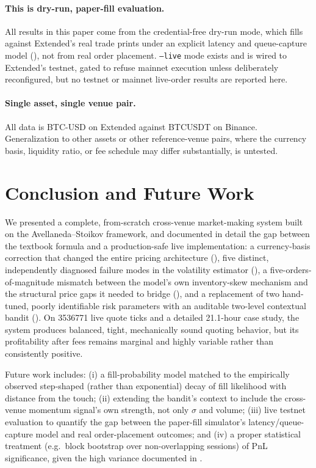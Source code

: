 \documentclass[11pt,a4paper]{article}
\begin{document}
\paragraph{This is dry-run, paper-fill evaluation.} All results in this paper come from the
credential-free dry-run mode, which fills against Extended's real trade prints under an explicit
latency and queue-capture model (), not from real order placement.
\texttt{--live} mode exists and is wired to Extended's testnet, gated to refuse mainnet execution
unless deliberately reconfigured, but no testnet or mainnet live-order results are reported here.

\paragraph{Single asset, single venue pair.} All data is BTC-USD on Extended against BTCUSDT on
Binance. Generalization to other assets or other reference-venue pairs, where the currency basis,
liquidity ratio, or fee schedule may differ substantially, is untested.

\section{Conclusion and Future Work}

We presented a complete, from-scratch cross-venue market-making system built on the
Avellaneda--Stoikov framework, and documented in detail the gap between the textbook formula and
a production-safe live implementation: a currency-basis correction that changed the entire
pricing architecture (), five distinct, independently diagnosed failure modes in
the volatility estimator (), a five-orders-of-magnitude mismatch between the
model's own inventory-skew mechanism and the structural price gaps it needed to bridge
(), and a replacement of two hand-tuned, poorly identifiable risk parameters with
an auditable two-level contextual bandit (). On \num{3536771} live quote ticks
and a detailed 21.1-hour case study, the system produces balanced, tight, mechanically sound
quoting behavior, but its profitability after fees remains marginal and highly variable rather
than consistently positive.

Future work includes: (i) a fill-probability model matched to the empirically observed
step-shaped (rather than exponential) decay of fill likelihood with distance from the touch;
(ii) extending the bandit's context to include the cross-venue momentum signal's own strength, not
only $\sigma$ and volume; (iii) live testnet evaluation to quantify the gap between the paper-fill
simulator's latency/queue-capture model and real order-placement outcomes; and (iv) a
proper statistical treatment (e.g.\ block bootstrap over non-overlapping sessions) of PnL
significance, given the high variance documented in .
\end{document}
